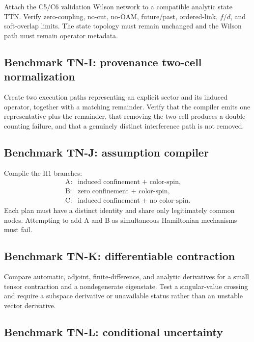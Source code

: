\documentclass[11pt]{article}
\begin{document}
Attach the C5/C6 validation Wilson network to a compatible analytic state TTN.
Verify zero-coupling, no-cut, no-OAM, future/past, ordered-link, \(f/d\), and
soft-overlap limits.  The state topology must remain unchanged and the Wilson
path must remain operator metadata.

\subsection{Benchmark TN-I: provenance two-cell normalization}

Create two execution paths representing an explicit sector and its induced
operator, together with a matching remainder.  Verify that the compiler emits
one representative plus the remainder, that removing the two-cell produces a
double-counting failure, and that a genuinely distinct interference path is
not removed.

\subsection{Benchmark TN-J: assumption compiler}

Compile the H1 branches:
\begin{equation}
 \begin{array}{ll}
 \text{A}:&\text{induced confinement + color-spin},\\
 \text{B}:&\text{zero confinement + color-spin},\\
 \text{C}:&\text{induced confinement + no color-spin}.
 \end{array}
\label{eq:h1-branches-benchmark}
\end{equation}
Each plan must have a distinct identity and share only legitimately common
nodes.  Attempting to add A and B as simultaneous Hamiltonian mechanisms must
fail.

\subsection{Benchmark TN-K: differentiable contraction}

Compare automatic, adjoint, finite-difference, and analytic derivatives for a
small tensor contraction and a nondegenerate eigenstate.  Test a singular-value
crossing and require a subspace derivative or unavailable status rather than an
unstable vector derivative.

\subsection{Benchmark TN-L: conditional uncertainty}
\end{document}

